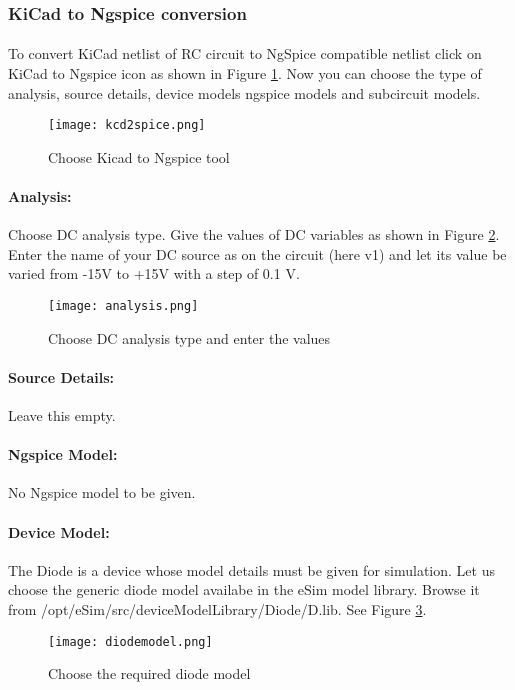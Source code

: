 \subsubsection{KiCad to Ngspice conversion}

\paragraph{} To convert KiCad netlist of RC circuit to NgSpice
compatible netlist click on KiCad to Ngspice icon as shown in Figure \ref{kcd2spice}.  Now you can choose the type of analysis, source details, device models ngspice models and subcircuit models.


\begin{figure}[h]
\centering
\texttt{[image: kcd2spice.png]}
\caption{Choose Kicad to Ngspice tool}
\label{kcd2spice}
\end{figure}


\paragraph{Analysis:}Choose DC analysis type. Give the values of DC variables as shown in Figure \ref{analysis}. Enter the name of your DC source as on the circuit (here v1) and let its value be varied from -15V to +15V with a step of 0.1 V.

\begin{figure}[h]
\centering
\texttt{[image: analysis.png]}
\caption{Choose DC analysis type and enter the values}
\label{analysis}
\end{figure}

\paragraph{Source Details:} Leave this empty.

\paragraph{Ngspice Model:} No Ngspice model to be given.

\paragraph{Device Model:} The Diode is a device whose model details must be given for simulation. Let us choose the generic diode model availabe in the eSim model library. Browse it from /opt/eSim/src/deviceModelLibrary/Diode/D.lib. See Figure \ref{diodemodel}.
\begin{figure}[h]
\centering
\texttt{[image: diodemodel.png]}
\caption{Choose the required diode model}
\label{diodemodel}
\end{figure}

